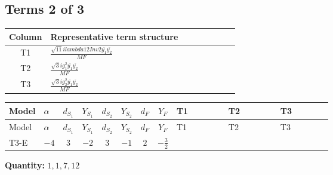 \documentclass[8pt]{article}
\begin{document}
\begin{landscape}
\subsection*{Terms 2 of 3}
\begin{center}
\begin{tabular}{@{}c >{\raggedright\arraybackslash}p{0.82\linewidth}@{}}
\toprule
Column & Representative term structure \\
\midrule
T1 & \(\displaystyle \frac{\sqrt{11} i lambda12Inv2 \overline{y_{1}} \overline{y_{2}}}{MF}\) \\
\midrule
T2 & \(\displaystyle \frac{\sqrt{3} i g_{1}^{2} \overline{y_{1}} \overline{y_{2}}}{MF}\) \\
\midrule
T3 & \(\displaystyle \frac{\sqrt{3} i g_{2}^{2} \overline{y_{1}} \overline{y_{2}}}{MF}\) \\
\midrule
\bottomrule
\end{tabular}
\end{center}
\smallskip
\tiny
\begin{longtable}{@{}llcccccc >{\raggedright\arraybackslash}p{0.21\linewidth} >{\raggedright\arraybackslash}p{0.21\linewidth} >{\raggedright\arraybackslash}p{0.21\linewidth}@{}}
\toprule
Model & $\alpha$ & $d_{S_1}$ & $Y_{S_1}$ & $d_{S_2}$ & $Y_{S_2}$ & $d_F$ & $Y_F$ & T1 & T2 & T3 \\
\midrule
\endfirsthead
\toprule
Model & $\alpha$ & $d_{S_1}$ & $Y_{S_1}$ & $d_{S_2}$ & $Y_{S_2}$ & $d_F$ & $Y_F$ & T1 & T2 & T3 \\
\midrule
\endhead
T3-E & $-4$ & $3$ & $-2$ & $3$ & $-1$ & $2$ & $-\frac{3}{2}$ & \scriptsize\adjustbox{max width=\linewidth}{$\begin{gathered} \frac{3 \sqrt{11} i lambda12Inv2 \overline{y_{1}} \overline{y_{2}}}{22 MF}\end{gathered}$} & \scriptsize\adjustbox{max width=\linewidth}{$\begin{gathered} \frac{9 \sqrt{3} i g_{1}^{2} \overline{y_{1}} \overline{y_{2}}}{8 MF}\end{gathered}$} & \scriptsize\adjustbox{max width=\linewidth}{$\begin{gathered} \frac{49 \sqrt{3} i g_{2}^{2} \overline{y_{1}} \overline{y_{2}}}{24 MF}\end{gathered}$} \\
\midrule
\bottomrule
\end{longtable}
\clearpage
\noindent\textbf{Quantity: }$\mathrm{1,1,7,12}$\par\smallskip

\end{landscape}
\end{document}
